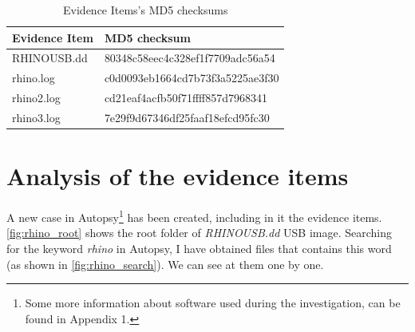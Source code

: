\documentclass{article}
\begin{document}
\begin{table}[h!]
	\centering
	\begin{tabular}{l|l}
		Evidence Item & MD5 checksum\\
		\hline
		RHINOUSB.dd & 80348c58eec4c328ef1f7709adc56a54\\
		rhino.log & c0d0093eb1664cd7b73f3a5225ae3f30\\
		rhino2.log & cd21eaf4acfb50f71ffff857d7968341\\
		rhino3.log & 7e29f9d67346df25faaf18efcd95fc30
	\end{tabular}
	\caption{Evidence Items's MD5 checksums}
	\label{tab:checksum}
\end{table}

\section{Analysis of the evidence items}
A new case in Autopsy\footnote{Some more information about software used during the investigation, can be found in Appendix 1.} has been created, including in it the evidence items. \autoref{fig:rhino_root} shows the root folder of \textit{RHINOUSB.dd} USB image.
Searching for the keyword \textit{rhino} in Autopsy, I have obtained files that contains this word (as shown in \autoref{fig:rhino_search}). We can see at them one by one.
\end{document}
